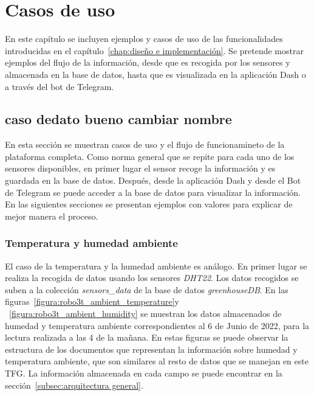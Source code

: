 \documentclass[a4paper, 12pt, oneside]{book}
\begin{document}

\cleardoublepage
\chapter{Casos de uso}
\label{chap:casos de uso}

En este capítulo se incluyen ejemplos y casos de uso de las funcionalidades introducidas en el capítulo~\ref{chap:diseño e implementación}. Se pretende mostrar ejemplos del flujo de la información, desde que es recogida por los sensores y almacenada en la base de datos, hasta que es visualizada en la aplicación Dash o a través del bot de Telegram.

\section{caso dedato bueno cambiar nombre}
\label{sec:aplicación de dash ejemplos}
En esta sección se muestran casos de uso y el flujo de funcionamineto de la plataforma completa.
Como norma general que se repite para cada uno de los sensores disponibles, en primer lugar el sensor recoge la información y es guardada en la base de datos. Después, desde la aplicación Dash y desde el Bot de Telegram se puede acceder a la base de datos para visualizar la información. En las siguientes secciones se presentan ejemplos con valores para explicar de mejor manera el proceso.

\subsection{Temperatura y humedad ambiente}
\label{subsec: temperatura y humedad ambiente}
El caso de la temperatura y la humedad ambiente es análogo. En primer lugar se realiza la recogida de datos usando los sensores \textit{DHT22}. Los datos recogidos se suben a la colección \textit{sensors\_data} de la base de datos \textit{greenhouseDB}. En las figuras~\ref{figura:robo3t_ambient_temperature}y ~\ref{figura:robo3t_ambient_humidity} se muestran los datos almacenados de humedad y temperatura ambiente correspondientes al 6 de Junio de 2022, para la lectura realizada a las 4 de la mañana. En estas figuras se puede observar la estructura de los documentos que representan la información sobre humedad y temperatura ambiente, que son similares al resto de datos que se manejan en este TFG. La información almacenada en cada campo se puede encontrar en la sección~\ref{subsec:arquitectura general}.
\end{document}

